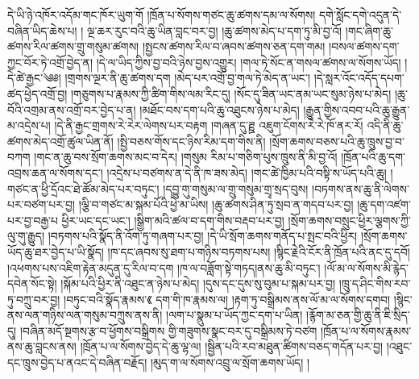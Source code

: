 དེ་ཡི་ཉེ་འཁོར་འདོམ་གང་ཁོར་ཡུག་གོ །ཁྲོན་པ་སོགས་གཙང་ཆུ་ཚགས་དམ་ལ་སོགས། དགེ་སློང་དགེ་འདུན་དེ་བཞིན་ཡིད་ཆེས་པ། ། ལྔ་ཆར་རུང་བའི་ཆུ་ཡིན་བླང་བར་བྱ། །ཆུ་ཚགས་མེད་པ་དག་ཏུ་མི་བྱ་འོ། །གང་ཞིག་ཆུ་ཚགས་རིལ་ཚགས་གྲུ་གསུམ་ཚགས། །སྤྱངས་ཚགས་རིལ་བ་ཞབས་ཚགས་ཅན་དག་གམ། །བསལ་ཚགས་དག་ཀྱང་བོར་ཏེ་འགྲོ་བྱེད་ན། །དེ་ལ་ཡིད་ཀྱིས་བྱ་བའི་ཉེས་བྱས་འགྱུར། །གལ་ཏེ་སོང་ན་གསལ་ཚགས་ལ་སོགས་ཡོད། །དེ་ཚེ་རྒྱང་༄༅། །གྲགས་ལྔར་ནི་ཆུ་ཚགས་དག །མེད་པར་འགྲོ་བྱ་གལ་ཏེ་མེད་ན་ཡང་། །དེ་སླར་འོང་འདོད་དཔག་ཚད་ཕྱེད་འགྲོ་བྱ། །གཅུགས་པ་རྣམས་ཀྱི་ཚིག་གིས་ལམ་རིང་དུ། །སོང་དུ་ཟིན་ཡང་ནམ་ཡང་སུམ་ཉེས་པ་མེད། །ཆུ་བོའི་འགྲམ་ནས་འགྲོ་བར་བྱེད་པ་ན། །མཐོང་བས་དག་པའི་ཆུ་འཐུངས་ཉེས་པ་མེད། །རྒྱུན་གྱིས་འབབ་པའི་ཆུ་རྒྱུན་མ་འདྲེས་པ། །དེ་ནི་རྒྱང་གྲགས་རེ་རེར་ལེགས་པར་བརྟག །གཞན་དུ་ཊྛ འཇུག་ངོགས་རེ་རེ་ཁོ་ནར་རོ། འདི་ནི་ཆུ་ཚགས་མེད་འགྲོ་ཚུལ་ཡིན་ནོ། །སྤྱི་བཅས་གོས་དང་ཉིས་རིམ་དག་གིས་ནི། །སྲོག་ཆགས་བཅས་པའི་ཆུ་ཁྲུས་བྱ་བ་བཀག །གང་ན་ཆུ་བས་སྲོག་ཆགས་མང་བ་དེར། །གསུམ རིམ་པ་གཅིག་པུས་ཁྲུས་ནི་མི་བྱ་འོ། །ཁྲོན་པའི་ཆུ་དག་འབྲས་ཆན་ལ་སོགས་དང་། །འདྲེས་པ་བཙགས་ན་དེ་ནི་ཁ་ཟས་མེད། །གང་ཚེ་ཁྱིམ་པའི་བསྟི་ས་ཡོད་པའི་ཆུ། །གཙང་ན་ཕྱི་དྲོའང་ཐེ་ཚོམ་མེད་པར་བཏུང་། །དབྱུ་གུ་གསུམ་ལ་གྲུ་གསུམ་གྲྭ་སྲད་བུས། །བཏགས་ནས་ཆུ་ནི་ལེགས་པར་བཙག་པར་བྱ། །ལྕི་བ་གཙང་མ་སྐམ་པོའི་ཕྱེ་མ་ཡིས། །ཆུ་ཚགས་ཤིན་ཏུ་སྲབ་ན་གདབ་པར་བྱ། །ཆུ་དག་འཛག་པར་བྱ་བརྒྱ་པ ཕྱིར་ཡང་དང་ཡང་། །སྒྱིག་མའི་ཚལ་བ་དག་གིས་བརྡབ་པར་བྱ། །སྲོག་ཆགས་བསྲུང་ཕྱིར་ལྕགས་ཀྱི་ལུ་གུ་རྒྱུད། །བཏགས་པའི་སྣོད་ནི་འོག་ཏུ་གཞག་པར་བྱ། །དེ་ཡི་སྲོག་ཆགས་གནོད་པ་སྤང་བའི་ཕྱིར། །སྲོག་ཆགས་ཡོད་ཆུ་ཐར་བྱེད་པ་ཡི་སྣོད། །ཁ་དང་ཞབས་སུ་ཐག་པ་གཉིས་བཏགས་པས། །སྙིང་རྗེའི་ངོར་ནི་ཁྲོན་པའི་ནང་དུ་དབོ། །འཕགས་པས་འཇིག་རྟེན་མདུན་དུ་རིལ་བ་དག །ཁ་ལ་བཟློག་སྟེ་གཏད།ནས་ཆུ་མི་བཏུང་། །ལོ་མ་ལ་སོགས་མི་རྙེད་དབེན་སོང་སྟེ། །སྐོམ་པའི་ཕྱིར་ནི་འཐུང་ན་ཉེས་པ་མེད། །དུས་དང་དུས་སུ་བུམ་པ་སྐམ་པར་བྱ། །ཁྲུ་ད་ཤིང་གིས་རབ་ཏུ་བཀྲུ་བར་བྱ། །བཏུང་བའི་སྣོད་རྣམས་《 དག་གི་ཁ་རྣམས་ལ། །རྟག་ཏུ་བསྒྲིམས་ནས་ལོ་མ་ལ་སོགས་དགབ། །སྙིང་ནས་ལན་གཉིས་ལན་གསུམ་བཀྲུས་ནས་ནི། །ལག་པ་སྣུམ་པ་ཡོད་ཀྱང་དག་པ་ཡིན། །རྙོག་མ་ཅན་གྱི་ཆུ་ནི་ཇི་སྲིད་དུ། །བཞིན་མདོ་སྔགས་རྩ་བ་ཕྱོགས་བསྒྲིགས གྱི་གཟུགས་སྣང་བར་དུ་བསྒྲིམས་ཏེ་བཙག །ཁྲོན་པ་ལ་སོགས་རྣམས་ནས་ཆུ་བླངས་ནས། །ཁྲོན་པ་ལ་སོགས་བྱེད་དེ་ཆུ་ལྷ་ལ། །སྦྱིན་པའི་རབ་མཐུན་ཚིགས་བཅད་གདོན་པར་བྱ། །འཐུང་དང་ཁྲུས་བྱེད་པ་ནའང་དེ་བཞིན་བརྗོད། །མུད་ག་ལ་སོགས་འབྲུ་ལ་སྲོག་ཆགས་ཡོད། །
